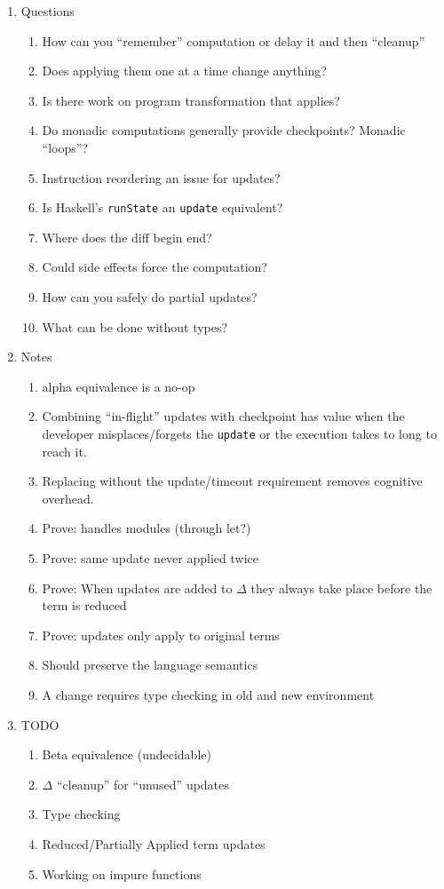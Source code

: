 \documentclass[12pt]{article}
\begin{document}
\begin{enumerate}
  \item Questions
    \begin{enumerate}
      \item How can you ``remember'' computation or delay it and then ``cleanup''
      \item Does applying them one at a time change anything?
      \item Is there work on program transformation that applies?
      \item Do monadic computations generally provide checkpoints? Monadic ``loops''?
      \item Instruction reordering an issue for updates?
      \item Is Haskell's \texttt{runState} an \texttt{update} equivalent?
      \item Where does the diff begin end?
      \item Could side effects force the computation?
      \item How can you safely do partial updates?
      \item What can be done without types?
    \end{enumerate}

  \item Notes
    \begin{enumerate}
      \item alpha equivalence is a no-op
      \item Combining ``in-flight'' updates with checkpoint has value when the developer misplaces/forgets the \texttt{update} or the execution takes to long to reach it.
      \item Replacing without the update/timeout requirement removes cognitive overhead.
      \item Prove: handles modules (through let?)
      \item Prove: same update never applied twice
      \item Prove: When updates are added to $\Delta$ they always take place before the term is reduced
      \item Prove: updates only apply to original terms
      \item Should preserve the language semantics
      \item A change requires type checking in old and new environment
    \end{enumerate}

  \item TODO
    \begin{enumerate}
      \item Beta equivalence (undecidable)
      \item $\Delta$ ``cleanup'' for ``unused'' updates
      \item Type checking
      \item Reduced/Partially Applied term updates
      \item Working on impure functions
    \end{enumerate}


\end{enumerate}
\end{document}
